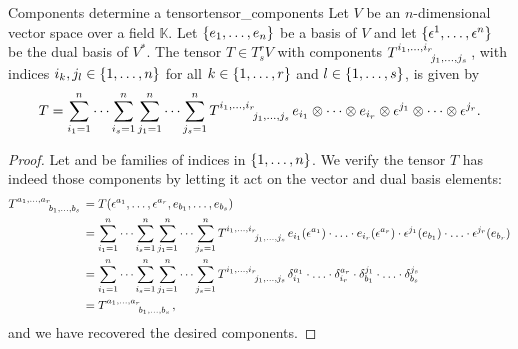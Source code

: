 \begin{proposition}{Components determine a tensor}{tensor_components}
    Let \(V\) be an \(n\)-dimensional vector space over a field \(\mathbb{K}\). Let \(\{e_1, \dots, e_n\}\) be a basis of \(V\) and let \(\{\epsilon^1, \dots, \epsilon^n\}\) be the dual basis of \(V ^{\ast}\). The tensor \(T \in T_s^rV\) with components \(T\indices{^{i_1, \dots, i_r}_{j_1, \dots, j_s}}\), with indices \(i_k, j_l \in \{1, \dots, n\}\) for all \(k \in \{1, \dots, r\}\) and \(l \in \{1, \dots, s\}\), is given by
    \begin{equation*}
        T = \sum_{i_1 = 1}^{n} \dots \sum_{i_s = 1}^{n} \sum_{j_1 = 1}^{n}\dots \sum_{j_s = 1}^n T\indices{^{i_1, \dots, i_r}_{j_1, \dots, j_s}} e_{i_1} \otimes \dots \otimes e_{i_r} \otimes \epsilon^{j_1} \otimes \dots \otimes \epsilon^{j_r}.
    \end{equation*}
\end{proposition}
\begin{proof}
    Let  and  be families of indices in \(\{1, \dots, n\}\). We verify the tensor \(T\) has indeed those components by letting it act on the vector and dual basis elements:
    {\allowdisplaybreaks
    \begin{align*}
        T\indices{^{a_1, \dots, a_r}_{b_1, \dots, b_s}} &= T(\epsilon^{a_1}, \dots, \epsilon^{a_r}, e_{b_1}, \dots, e_{b_s})\\
                                                        &= \sum_{i_1 = 1}^{n} \dots \sum_{i_s = 1}^{n} \sum_{j_1 = 1}^{n}\dots \sum_{j_s = 1}^n T\indices{^{i_1, \dots, i_r}_{j_1, \dots, j_s}} e_{i_1}(\epsilon^{a_1}) \cdot \dotso \cdot e_{i_r}(\epsilon^{a_r}) \cdot \epsilon^{j_1}(e_{b_1}) \cdot \dotso \cdot \epsilon^{j_r}(e_{b_r})\\
                                                        &= \sum_{i_1 = 1}^{n} \dots \sum_{i_s = 1}^{n} \sum_{j_1 = 1}^{n}\dots \sum_{j_s = 1}^n T\indices{^{i_1, \dots, i_r}_{j_1, \dots, j_s}} \delta^{a_1}_{i_1}\cdot \dotso \cdot \delta^{a_r}_{i_r}\cdot \delta^{j_1}_{b_1}\cdot \dotso \cdot \delta^{j_s}_{b_s}\\
                                                        &= T\indices{^{a_1, \dots, a_r}_{b_1, \dots, b_s}},
    \end{align*}
    }
    and we have recovered the desired components.
\end{proof}

